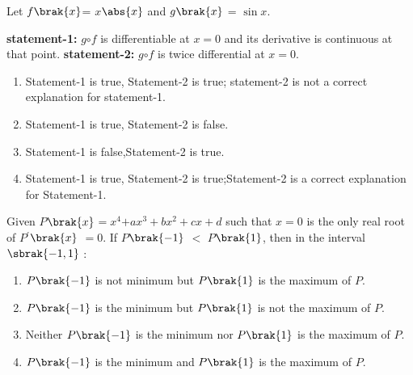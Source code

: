         \item Let $f\brak{x}$= $x$$\abs{x}$ and $g\brak{x}$ = $\sin{x}$. 
       \begin{enumerate}
          
        
    \textbf{statement-1:}  $g$$\circ$$f$ is differentiable at $x=0$ and its derivative is continuous at that point. 
 \newline  \textbf{statement-2:  }$g$$\circ$$f$ is twice differential at $x=0$.  
                 \hfill{} 
                  
        
      \end{enumerate}
        \begin{enumerate}
        
            
        
            \item Statement-1 is true, Statement-2 is true; statement-2 is not a correct explanation for statement-1.  
            
        \item Statement-1 is true, Statement-2 is false.  
        \item Statement-1 is false,Statement-2 is true.  
        \item Statement-1 is true, Statement-2 is true;Statement-2 is a correct explanation for Statement-1.  

        \end{enumerate}
        
            
        \item Given $P$$\brak{x}$$=$$x^4$$+$$ ax^3+bx^2+cx+d$ such that $x = 0$ is the only real root of $P$$^\prime$$\brak{x}$ $=$$0$. If $P$$\brak{-1}$ $<$ $P$$\brak{1}$, then in the interval $\sbrak{-1,1}$ $\colon$ \hfill{}
        
        \begin{enumerate}
        
            
        
            
        \item $P\brak{-1}$ is not minimum but $P\brak{1}$ is the maximum of $P$. 
        \item $P\brak{-1}$ is the minimum but $P\brak{1}$ is not the maximum of $P$. 
        \item  Neither $P\brak{-1}$ is the  minimum nor  $P\brak{1}$ is the maximum of $P$. 
        \item $P\brak{-1}$ is the minimum and $P\brak{1}$ is the maximum of $P$. 
        
        \end{enumerate}
        
